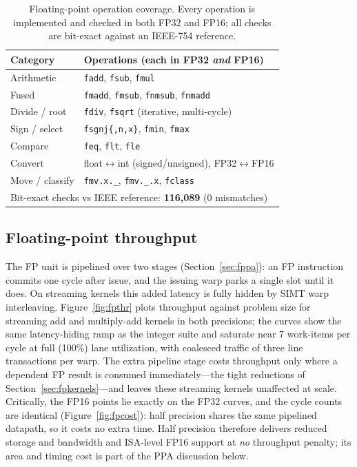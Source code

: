 \documentclass[conference]{IEEEtran}
\begin{document}
\begin{table}[t]
\caption{Floating-point operation coverage. Every operation is implemented and
checked in both FP32 and FP16; all checks are bit-exact against an IEEE-754
reference.}
\label{tab:fpverif}
\centering
\footnotesize
\begin{tabular}{ll}
\toprule
Category & Operations (each in FP32 \emph{and} FP16)\\
\midrule
Arithmetic     & \texttt{fadd}, \texttt{fsub}, \texttt{fmul}\\
Fused          & \texttt{fmadd}, \texttt{fmsub}, \texttt{fnmsub}, \texttt{fnmadd}\\
Divide / root  & \texttt{fdiv}, \texttt{fsqrt} (iterative, multi-cycle)\\
Sign / select  & \texttt{fsgnj\{,n,x\}}, \texttt{fmin}, \texttt{fmax}\\
Compare        & \texttt{feq}, \texttt{flt}, \texttt{fle}\\
Convert        & float$\leftrightarrow$int (signed/unsigned), FP32$\leftrightarrow$FP16\\
Move / classify& \texttt{fmv.x.\_}, \texttt{fmv.\_.x}, \texttt{fclass}\\
\midrule
\multicolumn{2}{l}{Bit-exact checks vs IEEE reference:
\textbf{116{,}089} (0 mismatches)}\\
\bottomrule
\end{tabular}
\end{table}

\subsection{Floating-point throughput}
The FP unit is pipelined over two stages (Section~\ref{sec:fppa}): an FP
instruction commits one cycle after issue, and the issuing warp parks a single
slot until it does. On streaming kernels this added latency is fully hidden by
SIMT warp interleaving. Figure~\ref{fig:fpthr} plots throughput against problem
size for streaming add and multiply-add kernels in both precisions; the curves
show the same latency-hiding ramp as the integer suite and saturate near 7
work-items per cycle at full (100\%) lane utilization, with coalesced traffic of
three line transactions per warp. The extra pipeline stage costs throughput only
where a dependent FP result is consumed immediately---the tight reductions of
Section~\ref{sec:fpkernels}---and leaves these streaming kernels unaffected at
scale. Critically, the FP16 points lie exactly on the FP32 curves, and the cycle
counts are identical (Figure~\ref{fig:fpcost}): half precision shares the same
pipelined datapath, so it costs no extra time. Half precision therefore delivers
reduced storage and bandwidth and ISA-level FP16 support at \emph{no} throughput
penalty; its area and timing cost is part of the PPA discussion below.
\end{document}
